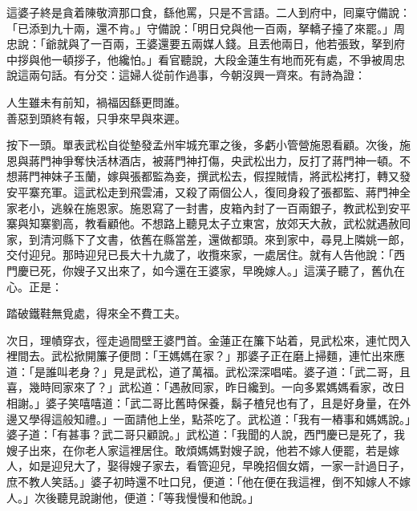 這婆子終是貪着陳敬濟那口食，繇他罵，只是不言語。{}二人到府中，囘稟守備說：「已添到九十兩，還不肯。」守備說：「明日兌與他一百兩，拏轎子擡了來罷。」周忠說：「爺就與了一百兩，王婆還要五兩媒人錢。且丟他兩日，他若張致，拏到府中拶與他一頓拶子，他纔怕。」看官聽說，大段金蓮生有地而死有處，不爭被周忠說這兩句話。有分交：這婦人從前作過事，今朝沒興一齊來。有詩為證：

\begin{myquote}
人生雖未有前知，禍福因繇更問誰。\\善惡到頭終有報，只爭來早與來遲。
\end{myquote}

按下一頭。單表武松自從墊發孟州牢城充軍之後，多虧小管營施恩看顧。次後，施恩與蔣門神爭奪快活林酒店，被蔣門神打傷，央武松出力，反打了蔣門神一頓。不想蔣門神妹子玉蘭，嫁與張都監為妾，撰武松去，假捏賊情，將武松拷打，轉又發安平寨充軍。這武松走到飛雲浦，又殺了兩個公人，復囘身殺了張都監、蔣門神全家老小，逃躲在施恩家。施恩寫了一封書，皮箱內封了一百兩銀子，教武松到安平寨與知寨劉高，教看顧他。不想路上聽見太子立東宮，放郊天大赦，武松就遇赦囘家，到清河縣下了文書，依舊在縣當差，還做都頭。來到家中，尋見上隣姚一郎，交付迎兒。那時迎兒已長大十九歲了，收攬來家，一處居住。就有人告他說：「西門慶已死，你嫂子又出來了，如今還在王婆家，早晚嫁人。」這漢子聽了，舊仇在心。正是：

\begin{myquote}
踏破鐵鞋無覓處，得來全不費工夫。
\end{myquote}

次日，理幘穿衣，徑走過間壁王婆門首。金蓮正在簾下站着，見武松來，連忙閃入裡間去。武松掀開簾子便問：「王媽媽在家？」那婆子正在磨上掃麵，連忙出來應道：「是誰叫老身？」見是武松，道了萬福。武松深深唱喏。婆子道：「武二哥，且喜，幾時囘家來了？」武松道：「遇赦囘家，昨日纔到。一向多累媽媽看家，改日相謝。」婆子笑嘻嘻道：「武二哥比舊時保養，鬍子楂兒也有了，且是好身量，在外邊又學得這般知禮。」{}一面請他上坐，點茶吃了。武松道：「我有一樁事和媽媽說。」婆子道：「有甚事？武二哥只顧說。」武松道：「我聞的人說，西門慶已是死了，我嫂子出來，在你老人家這裡居住。敢煩媽媽對嫂子說，他若不嫁人便罷，若是嫁人，如是迎兒大了，娶得嫂子家去，看管迎兒，早晚招個女婿，一家一計過日子，庶不教人笑話。」婆子初時還不吐口兒，便道：「他在便在我這裡，倒不知嫁人不嫁人。」次後聽見說謝他，便道：「等我慢慢和他說。」{}

